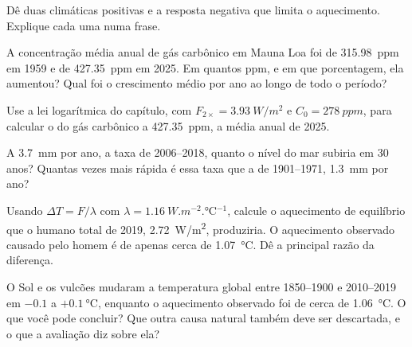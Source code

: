\begin{exercise}[$\star$]\label{exo:g12:climate-change:5}
Dê duas  climáticas positivas e a resposta negativa que
limita o aquecimento. Explique cada uma numa frase.
\end{exercise}

\begin{exercise}[$\star\star$]\label{exo:g12:climate-change:6}
A concentração média anual de gás carbônico em Mauna Loa foi de
\qty{315.98}{ppm} em 1959 e de \qty{427.35}{ppm} em 2025. Em quantos ppm, e
em que porcentagem, ela aumentou? Qual foi o crescimento médio por ano ao
longo de todo o período?
\end{exercise}

\begin{exercise}[$\star\star$]\label{exo:g12:climate-change:7}
Use a lei logarítmica do capítulo, com $F_{2\times} =
\qty{3.93}{W/m^2}$ e $C_0 = \qty{278}{ppm}$, para calcular o  do
gás carbônico a \qty{427.35}{ppm}, a média anual de 2025.
\end{exercise}

\begin{exercise}[$\star\star$]\label{exo:g12:climate-change:8}
A \qty{3.7}{mm} por ano, a taxa de 2006--2018, quanto o nível do mar subiria
em 30 anos? Quantas vezes mais rápida é essa taxa que a de 1901--1971,
\qty{1.3}{mm} por ano?
\end{exercise}

\begin{exercise}[$\star\star$]\label{exo:g12:climate-change:9}
Usando $\Delta T = F/\lambda$ com $\lambda = \qty{1.16}{W.m^{-2}.\degreeCelsius^{-1}}$,
calcule o aquecimento de equilíbrio que o  humano total de 2019,
\qty{2.72}{W/m^2}, produziria. O aquecimento observado causado pelo homem é
de apenas cerca de \qty{1.07}{\degreeCelsius}. Dê a principal razão da
diferença.
\end{exercise}

\begin{exercise}[$\star\star$]\label{exo:g12:climate-change:10}
O Sol e os vulcões mudaram a temperatura global entre 1850--1900 e
2010--2019 em $-0.1$ a $+\qty{0.1}{\degreeCelsius}$, enquanto o aquecimento
observado foi de cerca de \qty{1.06}{\degreeCelsius}. O que você pode
concluir? Que outra causa natural também deve ser descartada, e o que a
avaliação diz sobre ela?
\end{exercise}

